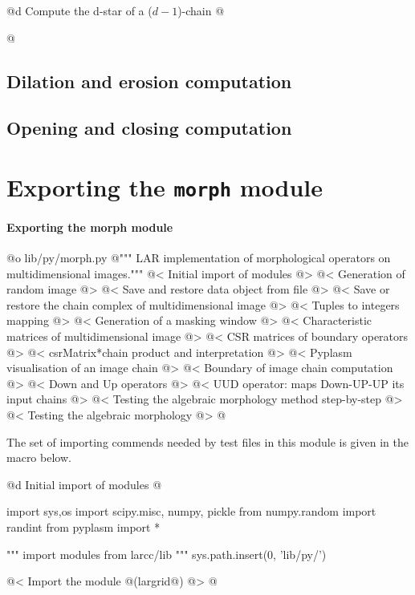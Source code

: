 \documentclass[11pt,oneside]{article}	%
\begin{document}
@d Compute the d-star of a ($d-1$)-chain
@{

@}


\subsection{Dilation and erosion computation}



\subsection{Opening and closing computation}




\section{Exporting the \texttt{morph} module}

\paragraph{Exporting the morph module}
@o lib/py/morph.py
@{""" LAR implementation of morphological operators on multidimensional images."""
@< Initial import of modules @>
@< Generation of random image @>
@< Save and restore data object from file @>
@< Save or restore the chain complex of multidimensional image @>
@< Tuples to integers mapping @>
@< Generation of a masking window @>
@< Characteristic matrices of multidimensional image @>
@< CSR matrices of boundary operators @>
@< csrMatrix*chain product and interpretation @>
@< Pyplasm visualisation of an image chain @>
@< Boundary of image chain computation @>
@< Down and Up operators @>
@< UUD operator: maps Down-UP-UP its input chains @>
@< Testing the algebraic morphology method step-by-step @> 
@< Testing the algebraic morphology @> 
@}

The set of importing commends needed by test files in this module is given in the macro below.

@d Initial import of modules
@{import sys,os
import scipy.misc, numpy, pickle
from numpy.random import randint
from pyplasm import *

""" import modules from larcc/lib """
sys.path.insert(0, 'lib/py/')

@< Import the module @(largrid@) @>
@}
\end{document}
